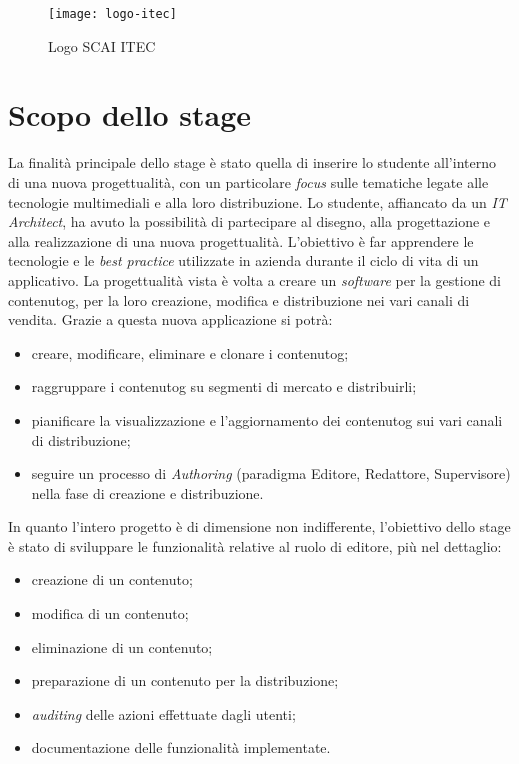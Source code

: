 \begin{figure}[h]
    \begin{center}
    \texttt{[image: logo-itec]}
    \caption{Logo SCAI ITEC}
    \label{fig:figure1}
    \end{center}
\end{figure}


\section{Scopo dello stage}
\label{sez:scopo}
La finalità principale dello stage è stato quella di inserire lo studente all'interno di una nuova progettualità, con un particolare \textit{focus} sulle tematiche legate alle tecnologie multimediali e alla loro distribuzione. Lo studente, affiancato da un \textit{IT Architect}, ha avuto la possibilità di partecipare al disegno, alla progettazione e alla realizzazione di una nuova progettualità. L'obiettivo è far apprendere le tecnologie e le \textit{best practice} utilizzate in azienda durante il ciclo di vita di un applicativo.
La progettualità vista è volta a creare un \textit{software} per la gestione di \gls{contenutog}\glsfirstoccur{}, per la loro creazione, modifica e distribuzione nei vari canali di vendita.
Grazie a questa nuova applicazione si potrà:
\begin{itemize}
    \item creare, modificare, eliminare e clonare i \gls{contenutog};
    \item raggruppare i \gls{contenutog} su segmenti di mercato e distribuirli;
    \item pianificare la visualizzazione e l’aggiornamento dei \gls{contenutog} sui vari canali di distribuzione;
    \item seguire un processo di \textit{Authoring} (paradigma Editore, Redattore, Supervisore) nella fase di creazione e distribuzione.
\end{itemize} 
In quanto l'intero progetto è di dimensione non indifferente, l'obiettivo dello stage è stato di sviluppare le funzionalità relative al ruolo di editore, più nel dettaglio:
\begin{itemize}
    \item creazione di un contenuto;
    \item modifica di un contenuto;
    \item eliminazione di un contenuto;
    \item preparazione di un contenuto per la distribuzione;
    \item \textit{auditing} delle azioni effettuate dagli utenti;
    \item documentazione delle funzionalità implementate.
\end{itemize}

